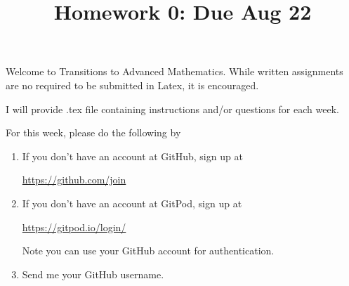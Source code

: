 \documentclass[12pt]{amsart}
\theoremstyle{definition}
\begin{document}
\title{Homework 0: Due Aug 22}

\maketitle

Welcome to Transitions to Advanced Mathematics. While written assignments are no required to be 
submitted in Latex, it is encouraged. 

I will provide .tex file containing instructions and/or questions for each week. 

For this week, please do the following by

\begin{enumerate}
	\item If you don't have an account at GitHub, sign up at 
		\begin{center}
			\href{https://github.com/join}{https://github.com/join}
		\end{center}
		
	\item If you don't have an account at GitPod, sign up at 
		\begin{center}
			\href{https://gitpod.io/login/}{https://gitpod.io/login/}
		\end{center}
	Note you can use your GitHub account for authentication. 
			
	\item Send me your GitHub username. 
\end{enumerate}
\end{document}

